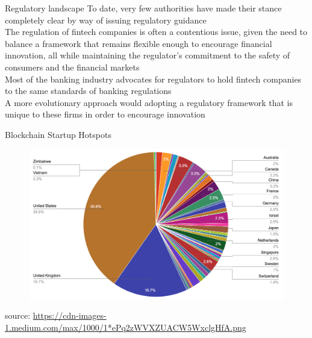 \documentclass[9pt]{beamer}
\begin{document}


\begin{frame}{Regulatory landscape}
	To date, very few authorities have made their stance completely clear by way of issuing regulatory guidance \\ \vspace{3mm}
	The regulation of fintech companies is often a contentious issue, given the need to balance a framework that remains flexible enough to encourage financial innovation, all while maintaining the regulator's commitment to the safety of consumers and the financial markets  \\ \vspace{3mm}
	Most of the banking industry advocates for regulators to hold fintech companies to the same standards of banking regulations \\ \vspace{3mm}
	A more evolutionary approach would adopting a regulatory framework that is unique to these firms in order to encourage innovation
\end{frame}


\begin{frame}{Blockchain Startup Hotspots}
	\begin{figure}[]
		\centering
		\includegraphics  [scale=0.2]{Images/startups}
	\end{figure}
	\begin{scriptsize}
		source: \href{https://medium.com/outlier-ventures-io/5-things-we-learned-from-analysing-the-location-of-950-blockchain-startups-96daa788560c}{https://cdn-images-1.medium.com/max/1000/1*ePq2zWVXZUACW5WxclgHfA.png}
	\end{scriptsize}
\end{frame}
\end{document}
